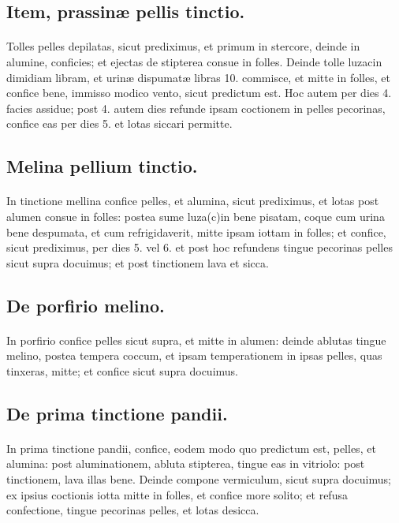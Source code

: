 \documentclass[a4paper, 11pt, oneside, polutonikogreek, italian]{article}
\begin{document}
\subsection{Item, prassinæ pellis tinctio.}
\paragraph{}
Tolles pelles depilatas, sicut prediximus, et primum in stercore, deinde in alumine, conficies; et ejectas de stipterea consue in folles. Deinde tolle luzacin dimidiam libram, et urinæ dispumatæ libras 10. commisce, et mitte in folles, et confice bene, immisso modico vento, sicut predictum est. Hoc autem per dies 4. facies assidue; post 4. autem dies refunde ipsam coctionem in pelles pecorinas, confice eas per dies 5. et lotas siccari permitte.

\subsection{Melina pellium tinctio.}
\paragraph{}
In tinctione mellina confice pelles, et alumina, sicut prediximus, et lotas post alumen consue in folles: postea sume luza(c)in bene pisatam, coque cum urina bene despumata, et cum refrigidaverit, mitte ipsam iottam in folles; et confice, sicut prediximus, per dies 5. vel 6. et post hoc refundens tingue pecorinas pelles sicut supra docuimus; et post tinctionem lava et sicca.

\subsection{De porfirio melino.}
\paragraph{}
In porfirio confice pelles sicut supra, et mitte in alumen: deinde ablutas tingue melino, postea tempera coccum, et ipsam temperationem in ipsas pelles, quas tinxeras, mitte; et confice sicut supra docuimus.

\subsection{De prima tinctione pandii.}
\paragraph{}
In prima tinctione pandii, confice, eodem modo quo predictum est, pelles, et alumina: post aluminationem, abluta stipterea, tingue eas in vitriolo: post tinctionem, lava illas bene. Deinde compone vermiculum, sicut supra docuimus; ex ipsius coctionis iotta mitte in folles, et confice more solito; et refusa confectione, tingue pecorinas pelles, et lotas desicca.
\end{document}
